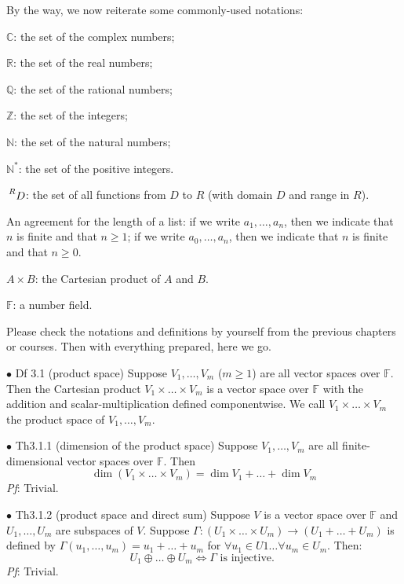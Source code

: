 \documentclass{article}
\begin{document}
By the way, we now reiterate some commonly-used notations:
\begin{compactenum}
    \item $\mathbb{C}$: the set of the complex numbers;
    \item $\mathbb{R}$: the set of the real numbers;
    \item $\mathbb{Q}$: the set of the rational numbers;
    \item $\mathbb{Z}$: the set of the integers;
    \item $\mathbb{N}$: the set of the natural numbers;
    \item $\mathbb{N^\ast}$: the set of the positive integers.
    \item $\sideset{^R}{}{\mathop{D}}$: the set of all functions from $D$ to $R$ (with domain $D$ and range in $R$).
    \item An agreement for the length of a list: if we write $a_1, \dots, a_n$, then we indicate that $n$ is finite and that $n\geq 1$; if we write $a_0, \dots, a_n$, then we indicate that $n$ is finite and that $n\geq 0$.
    \item $A\times B$: the Cartesian product of $A$ and $B$.
    \item $\mathbb{F}$: a number field.
\end{compactenum} 
Please check the notations and definitions by yourself from the previous chapters or courses. Then with everything prepared, here we go.

\begin{Df}{$\bullet$ Df 3.1 (product space)}
    Suppose $V_1, \dots, V_m$ ($m\geq 1$) are all vector spaces over $\mathbb{F}$. \textcolor{Th}{Then the Cartesian product $V_1\times \dots \times V_m$ is a vector space over $\mathbb{F}$ with the addition and scalar-multiplication defined componentwise.} We call $V_1\times \dots \times V_m$ the product space of $V_1, \dots, V_m$.
\end{Df}

\begin{Th}{$\bullet$ Th3.1.1 (dimension of the product space)}
    Suppose $V_1, \dots, V_m$ are all finite-dimensional vector spaces over $\mathbb{F}$. Then 
    $$\dim \left(V_1\times \dots \times V_m\right) = \dim V_1 + \dots +\dim V_m$$
    \tcblower
    \textit{Pf}: Trivial.
\end{Th}

\begin{Th}{$\bullet$ Th3.1.2 (product space and direct sum)}
    Suppose $V$ is a vector space over $\mathbb{F}$ and $U_1, \dots, U_m$ are subspaces of $V$. Suppose $\Gamma: (U_1\times \dots\times U_m) \rightarrow (U_1 + \dots +U_m)$ is defined by $\Gamma(u_1, \dots, u_m) = u_1 + \dots + u_m$ for $\forall u_1\in U1 \dots\forall u_m\in U_m$. Then:
    $$U_1\oplus\dots\oplus U_m \Leftrightarrow \Gamma \text{ is injective. }$$
    \tcblower
    \textit{Pf}: Trivial.
\end{Th}
\end{document}
